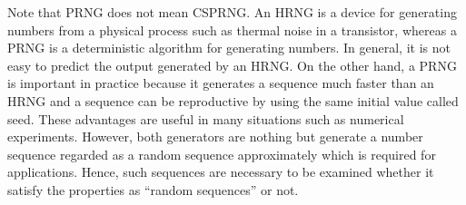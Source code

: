 %
Note that PRNG does not mean CSPRNG. 
An HRNG is a device for generating numbers from a physical process such as thermal noise in a transistor, whereas a PRNG is a deterministic algorithm for generating numbers.
%
In general, it is not easy to predict the output generated by an HRNG. On the other hand, a PRNG is important in practice because it generates a sequence much faster than an HRNG and a sequence can be reproductive by using the same initial value called seed. These advantages are useful in many situations such as numerical experiments.
%
However, both generators are nothing but generate a number sequence regarded as a random sequence approximately which is required for applications.
Hence, such sequences are necessary to be examined whether it satisfy the properties as ``random sequences'' or not.
